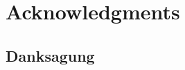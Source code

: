 %
%
%
\begingroup
\chapter*{Acknowledgments}
  
\blindtext[3]

\begin{german}
  \renewcommand{\cleardoublepage}{\clearpage}
  \chapter*{Danksagung}
  \slshape 
  
  \blindtext[3]
  
\end{german}
\newpage
\thispagestyle{empty}
\null
\endgroup
